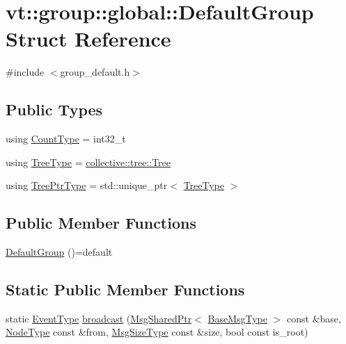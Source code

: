 \hypertarget{structvt_1_1group_1_1global_1_1_default_group}{}\section{vt\+:\+:group\+:\+:global\+:\+:Default\+Group Struct Reference}
\label{structvt_1_1group_1_1global_1_1_default_group}


{\ttfamily \#include $<$group\+\_\+default.\+h$>$}

\subsection*{Public Types}
\begin{DoxyCompactItemize}
\item 
using \hyperlink{structvt_1_1group_1_1global_1_1_default_group_a838e3ed0bd877d6ff703705c00c66e95}{Count\+Type} = int32\+\_\+t
\item 
using \hyperlink{structvt_1_1group_1_1global_1_1_default_group_a86d7ec049ad79c17fcb6b428534d0c1c}{Tree\+Type} = \hyperlink{structvt_1_1collective_1_1tree_1_1_tree}{collective\+::tree\+::\+Tree}
\item 
using \hyperlink{structvt_1_1group_1_1global_1_1_default_group_ab4b43c814196cd22463cfa0caad333d6}{Tree\+Ptr\+Type} = std\+::unique\+\_\+ptr$<$ \hyperlink{structvt_1_1group_1_1global_1_1_default_group_a86d7ec049ad79c17fcb6b428534d0c1c}{Tree\+Type} $>$
\end{DoxyCompactItemize}
\subsection*{Public Member Functions}
\begin{DoxyCompactItemize}
\item 
\hyperlink{structvt_1_1group_1_1global_1_1_default_group_ab21200c02abd2a011352bee173951942}{Default\+Group} ()=default
\end{DoxyCompactItemize}
\subsection*{Static Public Member Functions}
\begin{DoxyCompactItemize}
\item 
static \hyperlink{namespacevt_a009267401def7ae8bf201892222d060f}{Event\+Type} \hyperlink{structvt_1_1group_1_1global_1_1_default_group_a473b19ec41ee9fe654645405a313cca4}{broadcast} (\hyperlink{namespacevt_ab2b3d506ec8e8d1540aede826d84a239}{Msg\+Shared\+Ptr}$<$ \hyperlink{namespacevt_a44d0d4e144748f2b19a1cfd962f50338}{Base\+Msg\+Type} $>$ const \&base, \hyperlink{namespacevt_a866da9d0efc19c0a1ce79e9e492f47e2}{Node\+Type} const \&from, \hyperlink{namespacevt_a408e86a8c7c89309b52907dc5a513924}{Msg\+Size\+Type} const \&size, bool const is\+\_\+root)
\end{DoxyCompactItemize}
